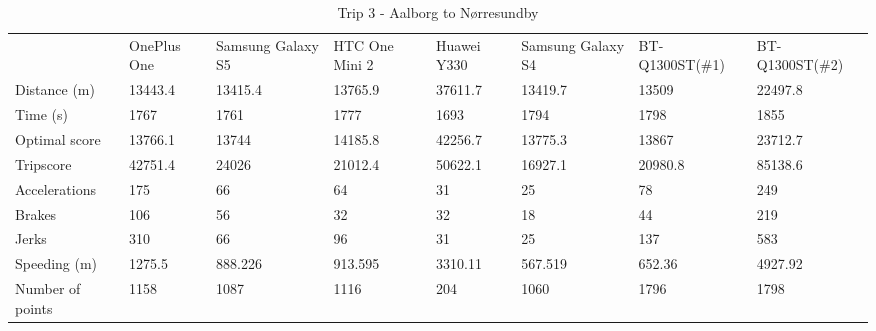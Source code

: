 \begin{table*}[tb]
\centering
\caption{Trip 3 - Aalborg to Nørresundby}
\label{my-label}
\begin{tabular}{llllllll}
                 & OnePlus One & Samsung Galaxy S5 & HTC One Mini 2 & Huawei Y330 & Samsung Galaxy S4 & BT-Q1300ST(\#1) & BT-Q1300ST(\#2) \\
Distance (m)     & 13443.4     & 13415.4           & 13765.9        & 37611.7     & 13419.7           & 13509           & 22497.8         \\
Time (s)         & 1767        & 1761              & 1777           & 1693        & 1794              & 1798            & 1855            \\
Optimal score    & 13766.1     & 13744             & 14185.8        & 42256.7     & 13775.3           & 13867           & 23712.7         \\
Tripscore        & 42751.4     & 24026             & 21012.4        & 50622.1     & 16927.1           & 20980.8         & 85138.6         \\
Accelerations    & 175         & 66                & 64             & 31          & 25                & 78              & 249             \\
Brakes           & 106         & 56                & 32             & 32          & 18                & 44              & 219             \\
Jerks            & 310         & 66                & 96             & 31          & 25                & 137             & 583             \\
Speeding (m)     & 1275.5      & 888.226           & 913.595        & 3310.11     & 567.519           & 652.36          & 4927.92         \\
Number of points & 1158        & 1087              & 1116           & 204         & 1060              & 1796            & 1798           
\end{tabular}
\end{table*}

